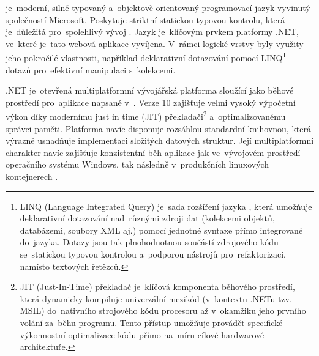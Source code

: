 \documentclass[
  master,
  program=ainfvs,
  printversion,
  figures=false,
  tables=false,
  glossaries,
  index
]{kidiplom}
\begin{document}
\csharp{} je~moderní, silně typovaný a~objektově orientovaný programovací jazyk vyvinutý společností Microsoft. Poskytuje striktní statickou typovou kontrolu, která je~důležitá pro~spolehlivý vývoj \cite{ms_dotnet}. Jazyk \csharp{} je~klíčovým prvkem platformy .NET, ve~které je~tato webová aplikace vyvíjena. V~rámci logické vrstvy byly využity jeho pokročilé vlastnosti, například deklarativní dotazování pomocí LINQ\footnote{\label{fn:linq}LINQ (Language Integrated Query) je~sada rozšíření jazyka \csharp{}, která umožňuje deklarativní dotazování nad~různými zdroji dat (kolekcemi objektů, databázemi, soubory XML aj.) pomocí jednotné syntaxe přímo integrované do~jazyka. Dotazy jsou tak plnohodnotnou součástí zdrojového kódu se~statickou typovou kontrolou a~podporou nástrojů pro~refaktorizaci, namísto textových řetězců.} dotazů pro~efektivní manipulaci s~kolekcemi.

.NET je~otevřená multiplatformní vývojářská platforma sloužící jako běhové prostředí pro~aplikace napsané v~\csharp. Verze 10 zajišťuje velmi vysoký výpočetní výkon díky modernímu just in time (JIT) překladači\footnote{JIT (Just-In-Time) překladač je~klíčová komponenta běhového prostředí, která dynamicky kompiluje univerzální mezikód (v~kontextu .NETu tzv. MSIL) do~nativního strojového kódu procesoru až v~okamžiku jeho prvního volání za~běhu programu. Tento přístup umožňuje provádět specifické výkonnostní optimalizace kódu přímo na~míru cílové hardwarové architektuře.} a~optimalizovanému správci paměti. Platforma navíc disponuje rozsáhlou standardní knihovnou, která výrazně usnadňuje implementaci složitých datových struktur. Její multiplatformní charakter navíc zajišťuje konzistentní běh aplikace jak ve~vývojovém prostředí operačního systému Windows, tak následně v~produkčních linuxových kontejnerech \cite{ms_dotnet}.
\end{document}
